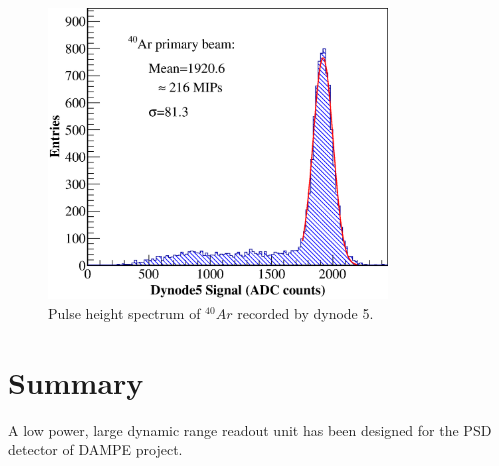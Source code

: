 \documentclass[5p, times]{elsarticle}
\begin{document}
\begin{figure}
 \centering
 \includegraphics[width=90mm]{Ar}
\caption{Pulse height spectrum of $^{40}Ar$ recorded by dynode 5.}
\label{fig:Ar}
\end{figure} 

\section{Summary}
\label{sec:summary}
A low power, large dynamic range readout unit has been designed for the PSD detector of DAMPE project.

\end{document}
